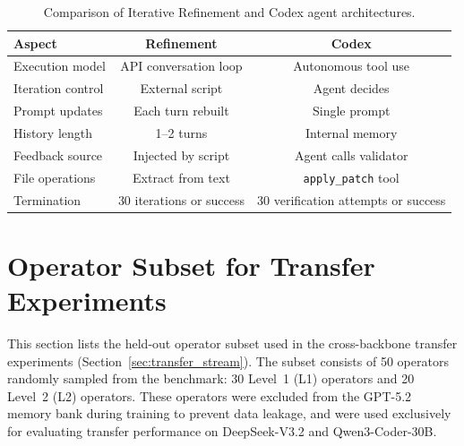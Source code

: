 \documentclass{article} %
\theoremstyle{definition}
\theoremstyle{remark}
\begin{document}
  \begin{table}[ht]
  \centering
  \caption{Comparison of Iterative Refinement and Codex agent architectures.}
  \label{tab:agentic_comparison}
  \setlength{\tabcolsep}{10pt}
  \begin{tabular}{lcc}
  \toprule
  \textbf{Aspect} & \textbf{Refinement} & \textbf{Codex} \\
  \midrule
  Execution model & API conversation loop & Autonomous tool use \\
  Iteration control & External script & Agent decides \\
  Prompt updates & Each turn rebuilt & Single prompt \\
  History length & 1--2 turns & Internal memory \\
  Feedback source & Injected by script & Agent calls validator \\
  File operations & Extract from text & \texttt{apply\_patch} tool \\
  Termination & 30 iterations or success & 30 verification attempts or success \\
  \bottomrule
  \end{tabular}
  \end{table}

  \section{Operator Subset for Transfer Experiments}
  \label{app:transfer_operators}

  This section lists the held-out operator subset used in the cross-backbone transfer experiments (Section~\ref{sec:transfer_stream}). The subset consists of 50 operators randomly sampled from the benchmark: 30 Level~1 (L1) operators and 20 Level~2 (L2) operators. These operators were excluded from the GPT-5.2 memory bank during training to prevent data leakage, and were used exclusively for evaluating transfer performance on DeepSeek-V3.2 and Qwen3-Coder-30B.
\end{document}
